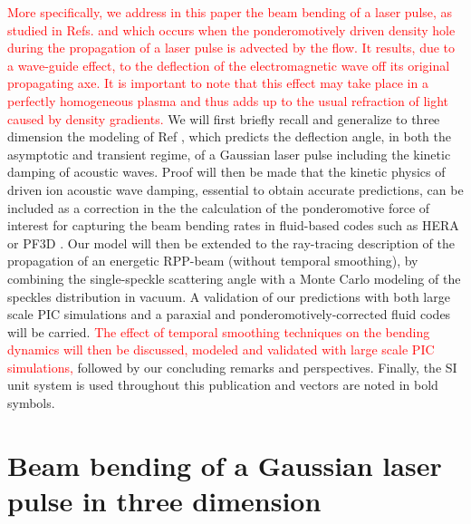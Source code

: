 \documentclass[%
 reprint,
 amsmath,amssymb,
 aps,
]{revtex4-1}
\begin{document}
\textcolor{red}{
More specifically, we address in this paper the beam bending  of  a laser pulse, as studied in Refs. \cite{PRL_Hinkel_1996,POP_Rose_96,Vu_1997,POP_Rose_97,PRL_Montgomery} and which occurs when the ponderomotively driven density hole  during the propagation of a laser pulse is advected by the flow. It results,  due to a wave-guide effect, to the deflection of the electromagnetic wave off its original propagating axe. It is important to note that  this effect may take place in a perfectly homogeneous plasma and thus adds up to the usual refraction of light caused by density gradients. }
We will first briefly recall and generalize to three dimension the modeling of Ref \cite[]{Ruyer_2020}, which predicts the deflection angle, in both the asymptotic and transient regime, of a Gaussian laser pulse including the kinetic damping of acoustic waves. 
Proof will then be made that the kinetic  physics of  driven ion acoustic wave damping, essential to obtain accurate predictions, can be   included as a correction in the 
 the calculation of the ponderomotive force of interest for capturing the beam bending rates in fluid-based codes such as HERA or PF3D  \cite{Berger_1995,Still_2006,Loiseau_2006, Huller_2006}. 
Our model  will then be extended to
the ray-tracing description of the propagation of an energetic RPP-beam (without temporal smoothing), by
combining the single-speckle scattering angle with a Monte Carlo modeling of the speckles distribution in vacuum. 
A validation of our  predictions with both large scale PIC simulations and a paraxial and ponderomotively-corrected fluid codes will be carried.
\textcolor{red}{
The effect of temporal smoothing techniques on the bending dynamics will then be discussed, modeled and validated with large scale PIC simulations,}
followed by our concluding remarks and perspectives. Finally, the SI unit system is used throughout this publication and vectors are noted in bold symbols. 

\section{Beam bending of a Gaussian laser pulse in three dimension}\label{sec:gauss}
\end{document}
